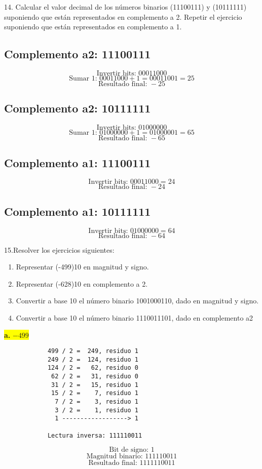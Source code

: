 \documentclass[a4paper,12pt]{article}
\begin{document}
	14. Calcular el valor decimal de los números binarios (11100111) y (10111111)
	suponiendo que están representados en complemento a 2. Repetir el ejercicio
	suponiendo que están representados en complemento a 1.
	
	\begin{center}
	\subsection*{Complemento a2: 11100111}
	\[
	\text{Invertir bits: } 00011000
	\]
	\[
	\text{Sumar 1: } 00011000 + 1 = 00011001 = 25
	\]
	\[
	\boxed{\text{Resultado final: } -25}
	\]
	
	\subsection*{Complemento a2: 10111111}
	\[
	\text{Invertir bits: } 01000000
	\]
	\[
	\text{Sumar 1: } 01000000 + 1 = 01000001 = 65
	\]
	\[
	\boxed{\text{Resultado final: } -65}
	\]	
	
	\subsection*{Complemento a1: 11100111}
	\[
	\text{Invertir bits: } 00011000 = 24
	\]
	\[
	\boxed{\text{Resultado final: } -24}
	\]
	
	\subsection*{Complemento a1: 10111111}
	\[
	\text{Invertir bits: } 01000000 = 64
	\]
	\[
	\boxed{\text{Resultado final: } -64}
	\]
	\end{center}
	
	15.Resolver los ejercicios siguientes:
	\begin{enumerate}
		\item Representar (-499)10 en magnitud y signo.
		\item Representar (-628)10 en complemento a 2.
		\item Convertir a base 10 el número binario 1001000110, dado en magnitud y signo.
		\item Convertir a base 10 el número binario 1110011101, dado en complemento a2
	\end{enumerate}
	
	\begin{center}
	\colorbox{yellow}{{\textbf{a.} $-499$}} \\ \vspace{0.3cm}
		\begin{Verbatim}
			499 / 2 =  249, residuo 1
			249 / 2 =  124, residuo 1
			124 / 2 =   62, residuo 0
			 62 / 2 =   31, residuo 0
			 31 / 2 =   15, residuo 1
			 15 / 2 =    7, residuo 1
			  7 / 2 =    3, residuo 1
			  3 / 2 =    1, residuo 1
			  1 ------------------> 1
		
	      	Lectura inversa: 111110011
	\end{Verbatim}
	\[
	\text{Bit de signo: } 1
	\]
	\[
	\text{Magnitud binario: }  111110011
	\]
	\[
	\boxed{\text{Resultado final: } 1111110011}
	\]
	\end{center}
	
\end{document}
